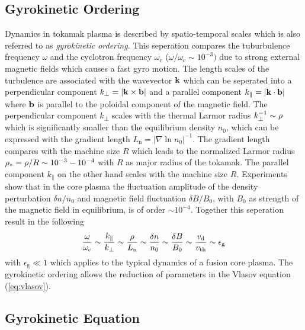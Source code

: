 \newpage

\subsection{Gyrokinetic Ordering}
\label{sub:gyroordering}

Dynamics in tokamak plasma is described by spatio-temporal scales which is also referred to as \textit{gyrokinetic ordering}. This seperation compares the tuburbulence frequency $\omega$ and the cyclotron frequency $\omega_\mathrm{c}$ ($\omega/\omega_\mathrm{c} \sim 10^{-3})$ due to strong external magnetic fields which causes a fast gyro motion. The length scales of the turbulence are associated with the wavevector $\boldsymbol{\mathbf{k}}$ which can be seperated into a perpendicular component $k_\perp = |\boldsymbol{\mathbf{k}} \times \boldsymbol{\mathbf{b}}|$ and a parallel component $k_\parallel = |\boldsymbol{\mathbf{k}} \cdot \boldsymbol{\mathbf{b}}|$ where $\boldsymbol{\mathbf{b}}$ is parallel to the poloidal component of the magnetic field. The perpendicular component $k_\perp$ scales with the thermal Larmor radius $k_\perp^{-1} \sim \rho$ which is significantly smaller than the equilibrium density $n_0$, which can be expressed with the gradient length $L_\mathrm{n} = |\nabla \ln n_0 |^{-1}$. The gradient length compares with the machine size $R$ which leads to the normalized Larmor radius $\rho_* = \rho/R \sim 10^{-3} - 10^{-4}$ with $R$ as major radius of the tokamak. The parallel component $k_\parallel$ on the other hand scales with the machine size $R$. Experiments show that in the core plasma the fluctuation amplitude of the density perturbation $\delta n/n_0$ and magnetic field fluctuation $\delta B/B_0$, with $B_0$ as strength of the magnetic field in equilibrium, is of order $\sim 10^{-4}$. Together this seperation result in the following
\begin{gather}
	\frac{\omega}{\omega_\mathrm{c}} \sim \frac{k_\parallel}{k_\perp} \sim \frac{\rho}{L_\mathrm{n}} \sim \frac{\delta n}{n_0} \sim \frac{\delta B}{B_0} \sim \frac{v_\mathrm{d}}{v_{\mathrm{th}}} \sim \epsilon_\mathrm{g}
	\label{eq:gyroordering}
\end{gather}
with $\epsilon_\mathrm{g} \ll 1$ which applies to the typical dynamics of a fusion core plasma. \cite{Brizard2007,Garbet2010} The gyrokinetic ordering allows the reduction of parameters in the Vlasov equation (\ref{eq:vlasov}).

\newpage

\subsection{Gyrokinetic Equation}
\label{sub:gyrokinetic}
 
